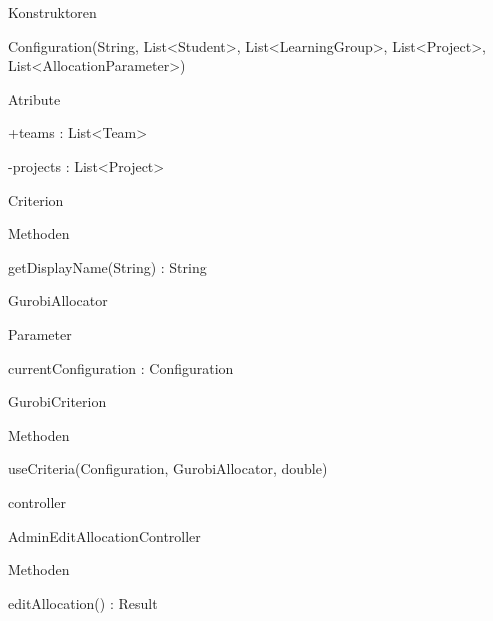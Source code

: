 \documentclass[parskip=full]{scrartcl}
\begin{document}
\begin{itemPackage}
\begin{itemClass}
\begin{itemClassSub}
\begin{itemMinus}
\end{itemMinus}
\item Konstruktoren
\begin{itemPlus}
\item Configuration(String, List<Student>, List<LearningGroup>, List<Project>,
List<AllocationParameter>)
\end{itemPlus}
\item Atribute
\begin{itemPlus}
\item +teams : List<Team>
\end{itemPlus}
\begin{itemMinus}
\item -projects : List<Project>
\end{itemMinus}
\end{itemClassSub}
\item Criterion
\begin{itemClassSub}
\item Methoden
\begin{itemPlus}
\item getDisplayName(String) : String
\end{itemPlus}
\end{itemClassSub}
\item GurobiAllocator
\begin{itemClassSub}
\item Parameter
\begin{itemPlus}
\item currentConfiguration : Configuration
\end{itemPlus}
\end{itemClassSub}
\item GurobiCriterion
\begin{itemClassSub}
\item Methoden
\begin{itemChange}
\item useCriteria(Configuration, GurobiAllocator, double)
\end{itemChange}
\end{itemClassSub}
\end{itemClass}
\item controller
\begin{itemClass}
\item AdminEditAllocationController
\begin{itemClassSub}
\item Methoden
\begin{itemPlus}
\item editAllocation() : Result

\end{itemPlus}
\end{itemClassSub}
\end{itemClass}
\end{itemPackage}
\end{document}
